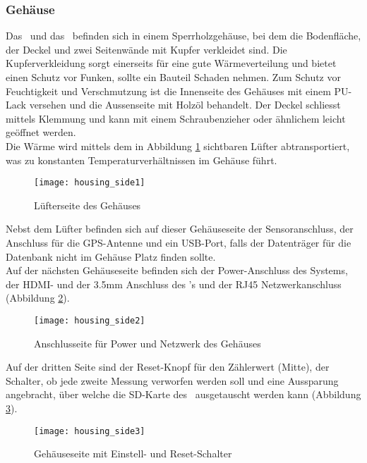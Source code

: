 \subsubsection{Gehäuse}
Das \rpi\ und das \hwb\ befinden sich in einem Sperrholzgehäuse, bei dem die Bodenfläche, der Deckel und zwei Seitenwände mit Kupfer verkleidet sind. 
Die Kupferverkleidung sorgt einerseits für eine gute Wärmeverteilung und bietet einen Schutz vor Funken, sollte ein Bauteil Schaden nehmen.
Zum Schutz vor Feuchtigkeit und Verschmutzung ist die Innenseite des Gehäuses mit einem PU-Lack versehen und die Aussenseite mit Holzöl behandelt. 
Der Deckel schliesst mittels Klemmung und kann mit einem Schraubenzieher oder ähnlichem leicht geöffnet werden.\\
Die Wärme wird mittels dem in Abbildung \ref{fig:housing_side1} sichtbaren Lüfter abtransportiert, was zu konstanten Temperaturverhältnissen im Gehäuse führt.
\begin{figure}[H]
	\centering
	\texttt{[image: housing\_side1]}
	\caption{Lüfterseite des Gehäuses}
	\label{fig:housing_side1}
\end{figure}
\noindent Nebst dem Lüfter befinden sich auf dieser Gehäuseseite der Sensoranschluss, der Anschluss für die GPS-Antenne und ein USB-Port, falls der Datenträger für die Datenbank nicht im Gehäuse Platz finden sollte.\\
Auf der nächsten Gehäuseseite befinden sich der Power-Anschluss des Systems, der HDMI- und der 3.5mm Anschluss des \rpi{}'s und der RJ45 Netzwerkanschluss (Abbildung \ref{fig:housing_side2}).
\begin{figure}[H]
	\centering
	\texttt{[image: housing\_side2]}
	\caption{Anschlusseite für Power und Netzwerk des Gehäuses}
	\label{fig:housing_side2}
\end{figure}
Auf der dritten Seite sind der Reset-Knopf für den Zählerwert (Mitte), der Schalter, ob jede zweite Messung verworfen werden soll und eine Aussparung angebracht, über welche die SD-Karte des \rpi\ ausgetauscht werden kann (Abbildung \ref{fig:housing_side3}).
\begin{figure}[H]
	\centering
	\texttt{[image: housing\_side3]}
	\caption{Gehäuseseite mit Einstell- und Reset-Schalter}
	\label{fig:housing_side3}
\end{figure}